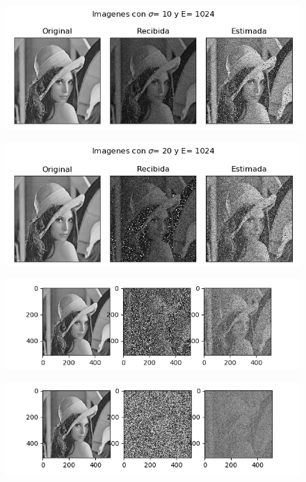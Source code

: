 \begin{figure}[H]
\includegraphics[scale=1]{Imagenes/E1024S10}
\centering
\end{figure}

\begin{figure}[H]
\includegraphics[scale=1]{Imagenes/E1024S20}
\centering
\end{figure}

\begin{figure}[H]
\includegraphics[scale=1]{Imagenes/E1024S50}
\centering
\end{figure}

\begin{figure}[H]
\includegraphics[scale=1]{Imagenes/E1024S100}
\centering
\end{figure}

